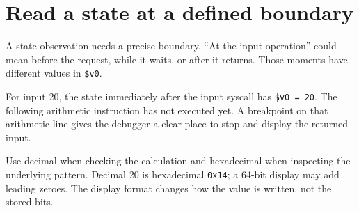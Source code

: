 \section{Read a state at a defined
  boundary}\label{001-console-calculation-p08-read-a-state-at-a-defined-boundary}

A state observation needs a precise boundary. ``At the input operation''
could mean before the request, while it waits, or after it returns.
Those moments have different values in \texttt{\$v0}.

For input 20, the state immediately after the input syscall has
\texttt{\$v0\ =\ 20}. The following arithmetic instruction has not
executed yet. A breakpoint on that arithmetic line gives the debugger a
clear place to stop and display the returned input.

Use decimal when checking the calculation and hexadecimal when
inspecting the underlying pattern. Decimal 20 is hexadecimal
\texttt{0x14}; a 64-bit display may add leading zeroes. The display
format changes how the value is written, not the stored bits.
